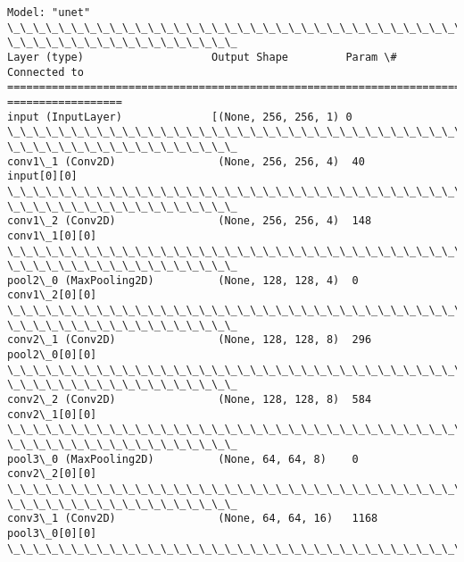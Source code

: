 \documentclass[11pt]{article}
\begin{document}
    \begin{Verbatim}[commandchars=\\\{\}]
Model: "unet"
\_\_\_\_\_\_\_\_\_\_\_\_\_\_\_\_\_\_\_\_\_\_\_\_\_\_\_\_\_\_\_\_\_\_\_\_\_\_\_\_\_\_\_\_\_\_\_\_\_\_\_\_\_\_\_\_\_\_\_\_\_\_\_\_\_\_\_\_\_\_\_\_\_\_\_\_\_\_\_\_
\_\_\_\_\_\_\_\_\_\_\_\_\_\_\_\_\_\_
Layer (type)                    Output Shape         Param \#     Connected to
================================================================================
==================
input (InputLayer)              [(None, 256, 256, 1) 0
\_\_\_\_\_\_\_\_\_\_\_\_\_\_\_\_\_\_\_\_\_\_\_\_\_\_\_\_\_\_\_\_\_\_\_\_\_\_\_\_\_\_\_\_\_\_\_\_\_\_\_\_\_\_\_\_\_\_\_\_\_\_\_\_\_\_\_\_\_\_\_\_\_\_\_\_\_\_\_\_
\_\_\_\_\_\_\_\_\_\_\_\_\_\_\_\_\_\_
conv1\_1 (Conv2D)                (None, 256, 256, 4)  40          input[0][0]
\_\_\_\_\_\_\_\_\_\_\_\_\_\_\_\_\_\_\_\_\_\_\_\_\_\_\_\_\_\_\_\_\_\_\_\_\_\_\_\_\_\_\_\_\_\_\_\_\_\_\_\_\_\_\_\_\_\_\_\_\_\_\_\_\_\_\_\_\_\_\_\_\_\_\_\_\_\_\_\_
\_\_\_\_\_\_\_\_\_\_\_\_\_\_\_\_\_\_
conv1\_2 (Conv2D)                (None, 256, 256, 4)  148         conv1\_1[0][0]
\_\_\_\_\_\_\_\_\_\_\_\_\_\_\_\_\_\_\_\_\_\_\_\_\_\_\_\_\_\_\_\_\_\_\_\_\_\_\_\_\_\_\_\_\_\_\_\_\_\_\_\_\_\_\_\_\_\_\_\_\_\_\_\_\_\_\_\_\_\_\_\_\_\_\_\_\_\_\_\_
\_\_\_\_\_\_\_\_\_\_\_\_\_\_\_\_\_\_
pool2\_0 (MaxPooling2D)          (None, 128, 128, 4)  0           conv1\_2[0][0]
\_\_\_\_\_\_\_\_\_\_\_\_\_\_\_\_\_\_\_\_\_\_\_\_\_\_\_\_\_\_\_\_\_\_\_\_\_\_\_\_\_\_\_\_\_\_\_\_\_\_\_\_\_\_\_\_\_\_\_\_\_\_\_\_\_\_\_\_\_\_\_\_\_\_\_\_\_\_\_\_
\_\_\_\_\_\_\_\_\_\_\_\_\_\_\_\_\_\_
conv2\_1 (Conv2D)                (None, 128, 128, 8)  296         pool2\_0[0][0]
\_\_\_\_\_\_\_\_\_\_\_\_\_\_\_\_\_\_\_\_\_\_\_\_\_\_\_\_\_\_\_\_\_\_\_\_\_\_\_\_\_\_\_\_\_\_\_\_\_\_\_\_\_\_\_\_\_\_\_\_\_\_\_\_\_\_\_\_\_\_\_\_\_\_\_\_\_\_\_\_
\_\_\_\_\_\_\_\_\_\_\_\_\_\_\_\_\_\_
conv2\_2 (Conv2D)                (None, 128, 128, 8)  584         conv2\_1[0][0]
\_\_\_\_\_\_\_\_\_\_\_\_\_\_\_\_\_\_\_\_\_\_\_\_\_\_\_\_\_\_\_\_\_\_\_\_\_\_\_\_\_\_\_\_\_\_\_\_\_\_\_\_\_\_\_\_\_\_\_\_\_\_\_\_\_\_\_\_\_\_\_\_\_\_\_\_\_\_\_\_
\_\_\_\_\_\_\_\_\_\_\_\_\_\_\_\_\_\_
pool3\_0 (MaxPooling2D)          (None, 64, 64, 8)    0           conv2\_2[0][0]
\_\_\_\_\_\_\_\_\_\_\_\_\_\_\_\_\_\_\_\_\_\_\_\_\_\_\_\_\_\_\_\_\_\_\_\_\_\_\_\_\_\_\_\_\_\_\_\_\_\_\_\_\_\_\_\_\_\_\_\_\_\_\_\_\_\_\_\_\_\_\_\_\_\_\_\_\_\_\_\_
\_\_\_\_\_\_\_\_\_\_\_\_\_\_\_\_\_\_
conv3\_1 (Conv2D)                (None, 64, 64, 16)   1168        pool3\_0[0][0]
\_\_\_\_\_\_\_\_\_\_\_\_\_\_\_\_\_\_\_\_\_\_\_\_\_\_\_\_\_\_\_\_\_\_\_\_\_\_\_\_\_\_\_\_\_\_\_\_\_\_\_\_\_\_\_\_\_\_\_\_\_\_\_\_\_\_\_\_\_\_\_\_\_\_\_\_\_\_\_\_

\end{Verbatim}
\end{document}

